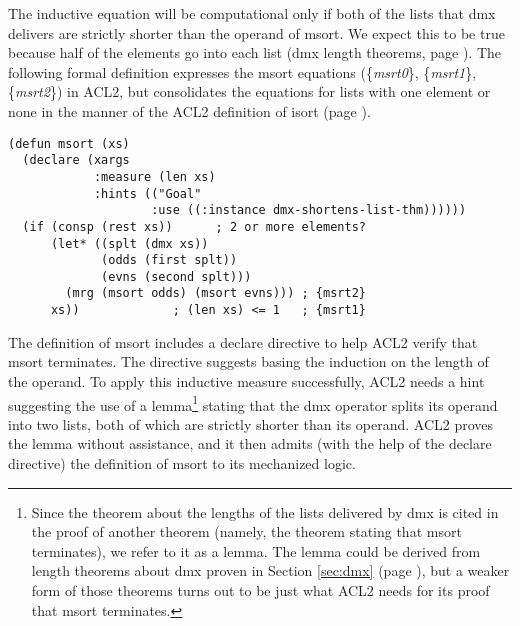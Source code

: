 The inductive equation will be computational only if
both of the lists that \textsf{dmx} delivers are strictly
shorter than the operand of \textsf{msort}.
We expect this to be true because half
of the elements go into each list
(\textsf{dmx} length theorems, page \pageref{thm:dmx-length-first-second}).
The following formal definition expresses the \textsf{msort}
equations (\{\emph{msrt0}\}, \{\emph{msrt1}\}, \{\emph{msrt2}\}) in ACL2,
but consolidates the equations for lists with one element or none in the
manner of the ACL2 definition of \textsf{isort} (page \pageref{defun:isort}).

\label{defun:msort}\label{eq:msrt1}
\begin{code}
\begin{verbatim}
(defun msort (xs)
  (declare (xargs
            :measure (len xs)
            :hints (("Goal"
                    :use ((:instance dmx-shortens-list-thm))))))
  (if (consp (rest xs))      ; 2 or more elements?
      (let* ((splt (dmx xs))
             (odds (first splt))
             (evns (second splt)))
        (mrg (msort odds) (msort evns))) ; {msrt2}
      xs))             ; (len xs) <= 1   ; {msrt1}
\end{verbatim}
\end{code}

The definition of \textsf{msort} includes
a \textsf{declare} directive
to help ACL2 verify that \textsf{msort} terminates.
The directive suggests basing the induction on the length of the operand.
To apply this inductive measure successfully,
ACL2 needs a hint suggesting the use of a lemma\footnote{Since
the theorem about the lengths of the lists
delivered by \textsf{dmx} is cited in the proof of another theorem
(namely, the theorem stating that \textsf{msort} terminates),
we refer to it as a lemma.
The lemma could be derived from length theorems about \textsf{dmx}
proven in Section \ref{sec:dmx} (page \pageref{thm:dmx-length-first-second}),
but a weaker form of those theorems turns out to be just what
ACL2 needs for its proof that \textsf{msort} terminates.}
stating that the \textsf{dmx} operator splits its
operand into two lists, both of which are strictly shorter than its operand.
ACL2 proves the lemma without assistance,
and it then admits (with the help of the \textsf{declare} directive)
the definition of \textsf{msort} to its mechanized logic.

